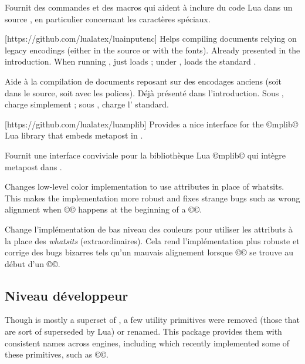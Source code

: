 \documentclass{lltxdoc}
\begin{document}
{Fournit des commandes et des macros qui aident à inclure du code Lua dans un source \tex, en particulier concernant les caractères spéciaux.

[https://github.com/lualatex/luainputenc]
Helps compiling documents relying on legacy encodings (either in the source or
with the fonts). Already presented in the introduction. When running \xetex,
just loads ; under \pdftex, loads the standard
.

Aide à la compilation de documents reposant sur des encodages anciens (soit dans le source, soit avec les polices). Déjà présenté dans l'introduction. Sous \xetex, charge simplement ; sous \pdftex, charge l' standard.

[https://github.com/lualatex/luamplib]
Provides a nice interface for the ©mplib© Lua library that embeds metapost in
\luatex.

Fournit une interface conviviale pour la bibliothèque Lua ©mplib© qui intègre metapost dans \luatex.

Changes low-level color implementation to use \luatex attributes in place of
whatsits. This makes the implementation more robust and fixes strange bugs
such as wrong alignment when ©\color© happens at the beginning of a ©\vbox©.

Change l'implémentation de bas niveau des couleurs pour utiliser les attributs \luatex à la place des \emph{whatsits} ( extraordinaires\fg). Cela rend l'implémentation plus robuste et corrige des bugs bizarres tels qu'un mauvais alignement lorsque ©\color© se trouve au début d'un ©\vbox©.

\subsection{Niveau développeur}

Though \luatex is mostly a superset of \pdftex, a few utility primitives were
removed (those that are sort of superseded by Lua) or renamed. This package
provides them with consistent names across engines, including \xetex which
recently implemented some of these primitives, such as ©\strcmp©.

}
\end{document}
